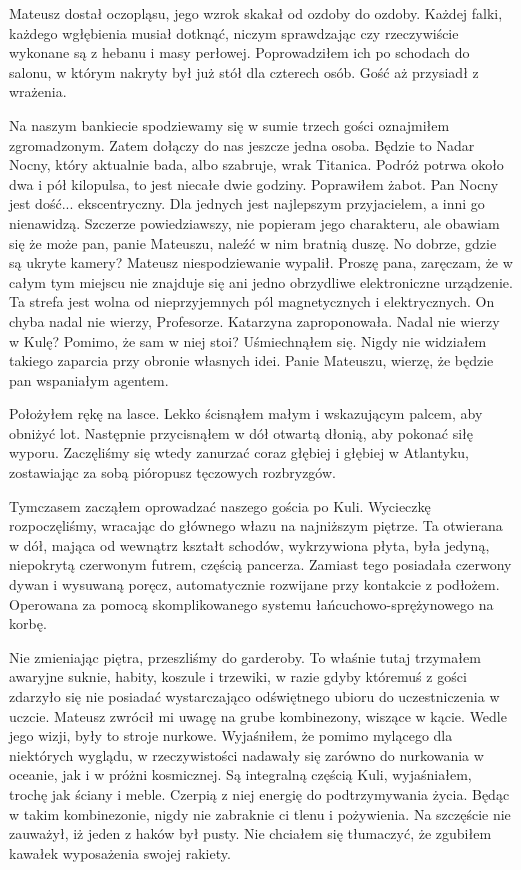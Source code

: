 Mateusz dostał oczopląsu, jego wzrok skakał od ozdoby do ozdoby. Każdej falki, każdego wgłębienia musiał dotknąć, niczym sprawdzając czy rzeczywiście wykonane są z hebanu i masy perłowej. 
Poprowadziłem ich po schodach do salonu, w którym nakryty był już stół dla czterech osób.
Gość aż przysiadł z wrażenia.
\begin{dialogue}
\ds{} Na naszym bankiecie spodziewamy się w sumie trzech gości \dm{} oznajmiłem zgromadzonym. \dm{} Zatem dołączy do nas jeszcze jedna osoba.
Będzie to Nadar Nocny, który aktualnie bada, albo szabruje, wrak Titanica. Podróż potrwa około dwa i pół kilopulsa, to jest niecałe dwie godziny.
\dm{} Poprawiłem żabot. \dm{}
Pan Nocny jest dość... ekscentryczny. Dla jednych jest najlepszym przyjacielem, a inni go nienawidzą.
Szczerze powiedziawszy, nie popieram jego charakteru, ale obawiam się że może pan, panie Mateuszu, naleźć w nim bratnią duszę.
\ds{} No dobrze, gdzie są ukryte kamery? \dm{} Mateusz niespodziewanie wypalił.
\ds{} Proszę pana, zaręczam, że w całym tym miejscu nie znajduje się ani jedno obrzydliwe elektroniczne urządzenie. Ta strefa jest wolna od nieprzyjemnych pól magnetycznych i elektrycznych.
\ds{} On chyba nadal nie wierzy, Profesorze. \dm{} Katarzyna zaproponowała. 
\ds{} Nadal nie wierzy w Kulę? Pomimo, że sam w niej stoi? \dm{} Uśmiechnąłem się. \dm{} Nigdy nie widziałem takiego zaparcia przy obronie własnych idei. Panie Mateuszu, wierzę, że będzie pan wspaniałym agentem.
\end{dialogue}

Położyłem rękę na lasce. Lekko ścisnąłem małym i wskazującym palcem, aby obniżyć lot.
Następnie przycisnąłem w dół otwartą dłonią, aby pokonać siłę wyporu.
Zaczęliśmy się wtedy zanurzać coraz głębiej i głębiej w Atlantyku, zostawiając za sobą pióropusz tęczowych rozbryzgów.

Tymczasem zacząłem oprowadzać naszego gościa po Kuli.
Wycieczkę rozpoczęliśmy, wracając do głównego włazu na najniższym piętrze.
Ta otwierana w dół, mająca od wewnątrz kształt schodów, wykrzywiona płyta, była jedyną, niepokrytą czerwonym futrem, częścią pancerza.
Zamiast tego posiadała czerwony dywan i wysuwaną poręcz, automatycznie rozwijane przy kontakcie z podłożem.
Operowana za pomocą skomplikowanego systemu łańcuchowo-sprężynowego na korbę.

Nie zmieniając piętra, przeszliśmy do garderoby.
To właśnie tutaj trzymałem awaryjne suknie, habity, koszule i trzewiki, w razie gdyby któremuś z gości zdarzyło się nie posiadać wystarczająco odświętnego ubioru do uczestniczenia w uczcie.
Mateusz zwrócił mi uwagę na grube kombinezony, wiszące w kącie. Wedle jego wizji, były to stroje nurkowe.
Wyjaśniłem, że pomimo mylącego dla niektórych wyglądu, w rzeczywistości nadawały się zarówno do nurkowania w oceanie, jak i w próżni kosmicznej.
Są integralną częścią Kuli, wyjaśniałem, trochę jak ściany i meble. Czerpią z niej energię do podtrzymywania życia. 
Będąc w takim kombinezonie, nigdy nie zabraknie ci tlenu i pożywienia.
Na szczęście nie zauważył, iż jeden z haków był pusty. Nie chciałem się tłumaczyć, że zgubiłem kawałek wyposażenia swojej rakiety.

